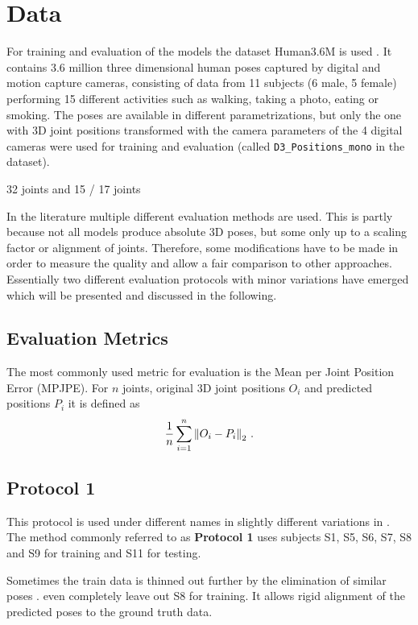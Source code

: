 \section{Data}
\label{sec:data}

For training and evaluation of the models the dataset Human3.6M is used \cite{ionescu14}. 
It contains 3.6 million three dimensional human poses captured by digital and motion capture cameras, consisting of data from 11 subjects (6 male, 5 female) performing 15 different activities such as walking, taking a photo, eating or smoking.
The poses are available in different parametrizations, but only the one with 3D joint positions transformed with the camera parameters of the 4 digital cameras were used for training and evaluation (called \texttt{D3\_Positions\_mono} in the dataset).

32 joints and 15 / 17 joints

In the literature multiple different evaluation methods are used. 
This is partly because not all models produce absolute 3D poses, but some only up to a scaling factor or alignment of joints.
Therefore, some modifications have to be made in order to measure the quality and allow a fair comparison to other approaches.
Essentially two different evaluation protocols with minor variations have emerged which will be presented and discussed in the following.

\subsection{Evaluation Metrics}
The most commonly used metric for evaluation is the Mean per Joint Position Error (MPJPE).
For $n$ joints, original 3D joint positions $O_i$ and predicted positions $P_i$ it is defined as
\begin{equation}
	\frac{1}{n} \sum_{i = 1}^{n}  \norm{O_i - P_i}_2 \ .
\end{equation}

\subsection{Protocol 1}

This protocol is used under different names in slightly different variations in \cite{sun17, drover18, moreno-noguer16, yasin16, kostrikov14, tome17}.
The method commonly referred to as \textbf{Protocol 1} uses subjects S1, S5, S6, S7, S8 and S9 for training and S11 for testing.

Sometimes the train data is thinned out further by the elimination of similar poses \cite{yasin16}.
\citet{drover18} even completely leave out S8 for training.
It allows rigid alignment \cite{drover18, yasin16, kostrikov14, sun17, tome17, chen17} of the predicted poses to the ground truth data.


